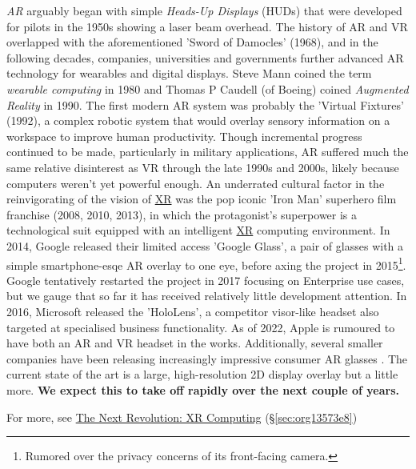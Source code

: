 \documentclass[logo,bsc,singlespacing,parskip]{infthesis}
\begin{document}
\emph{AR} arguably began with simple \emph{Heads-Up Displays} (HUDs) that were developed for pilots in the 1950s showing a laser beam overhead.
The history of AR and VR overlapped with the aforementioned 'Sword of Damocles' (1968), and in the following decades, companies, universities and governments further advanced AR technology for wearables and digital displays.
Steve Mann coined the term \emph{wearable computing} in 1980 and Thomas P Caudell (of Boeing) coined \emph{Augmented Reality} in 1990.
The first modern AR system was probably the 'Virtual Fixtures' (1992), a complex robotic system that would overlay sensory information on a workspace to improve human productivity.
Though incremental progress continued to be made, particularly in military applications, AR suffered much the same relative disinterest as VR through the late 1990s and 2000s, likely because computers weren't yet powerful enough.
An underrated cultural factor in the reinvigorating of the vision of \hyperref[org1d567af]{XR} was the pop iconic 'Iron Man' superhero film franchise (2008, 2010, 2013),  in which the protagonist's superpower is a technological suit equipped with an intelligent \hyperref[org1d567af]{XR} computing environment.
In 2014, Google released their limited access 'Google Glass', a pair of glasses with a simple smartphone-esqe AR overlay to one eye, before axing the project in 2015\footnote{Rumored over the privacy concerns of its front-facing camera.}.
Google tentatively restarted the project in 2017 focusing on Enterprise use cases, but we gauge that so far it has received relatively little development attention.
In 2016, Microsoft released the 'HoloLens', a competitor visor-like headset also targeted at specialised business functionality.
As of 2022, Apple is rumoured to have both an AR and VR headset in the works.
Additionally, several smaller companies have been releasing increasingly impressive consumer AR glasses \autocites{NrealAir}[][]{INMOAIRWorld}[][]{VuzixBladeUpgraded}.
The current state of the art is a large, high-resolution 2D display overlay but a little more.
\textbf{We expect this to take off rapidly over the next couple of years.}

For more, see \hyperref[sec:org13573e8]{The Next Revolution: XR Computing} (\S \ref{sec:org13573e8})
\end{document}

